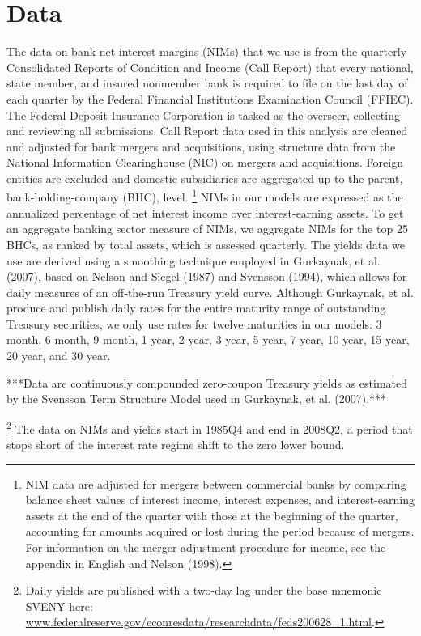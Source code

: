 \documentclass[12pt]{article}
\begin{document}
\section{Data}
The data on bank net interest margins (NIMs) that we use is from the quarterly Consolidated Reports of Condition and Income (Call Report) that every national, state member, and insured nonmember bank is required to file on the last day of each quarter by the Federal Financial Institutions Examination Council (FFIEC). The Federal Deposit Insurance Corporation is tasked as the overseer, collecting and reviewing all submissions. Call Report data used in this analysis are cleaned and adjusted for bank mergers and acquisitions, using structure data from the National Information Clearinghouse (NIC) on mergers and acquisitions. Foreign entities are excluded and domestic subsidiaries are aggregated up to the parent, bank-holding-company (BHC), level. \footnote{NIM data are adjusted for mergers between commercial banks by comparing balance sheet values of interest income, interest expenses, and interest-earning assets at the end of the quarter with those at the beginning of the quarter, accounting for amounts acquired or lost during the period because of mergers. For information on the merger-adjustment procedure for income, see the appendix in English and Nelson (1998).} \newline \newline
NIMs in our models are expressed as the annualized percentage of net interest income over interest-earning assets. To get an aggregate banking sector measure of NIMs, we aggregate NIMs for the top 25 BHCs, as ranked by total assets, which is assessed quarterly. \newline \newline
The yields data we use are derived using a smoothing technique employed in Gurkaynak, et al. (2007), based on Nelson and Siegel (1987) and Svensson (1994), which allows for daily measures of an off-the-run Treasury yield curve. Although Gurkaynak, et al. produce and publish daily rates for the entire maturity range of outstanding Treasury securities, we only use rates for twelve maturities in our models: 3 month, 6 month, 9 month, 1 year, 2 year, 3 year, 5 year, 7 year, 10 year, 15 year, 20 year, and 30 year.

***Data are continuously compounded zero-coupon Treasury yields as estimated by the Svensson Term Structure Model used in Gurkaynak, et al. (2007).***

 \footnote{Daily yields are published with a two-day lag under the base mnemonic SVENY here: \url{www.federalreserve.gov/econresdata/researchdata/feds200628_1.html}.} \newline \newline
The data on NIMs and yields start in 1985Q4 and end in 2008Q2, a period that stops short of the interest rate regime shift to the zero lower bound.
\end{document}
